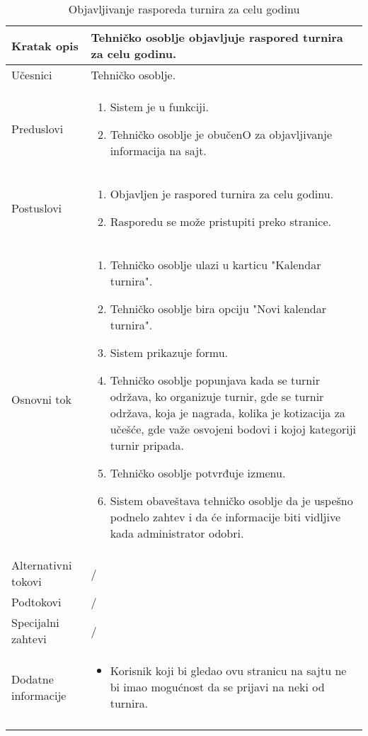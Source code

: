 \documentclass{article}
\begin{document}
    \begin{longtable}{| p{} | p{} |} 
        \hline
            Kratak opis & Tehničko osoblje objavljuje raspored turnira za celu godinu.\\ 
        \hline    
            Učesnici & Tehničko osoblje.\\
        \hline
            Preduslovi & 
                \begin{enumerate}
                    \item Sistem je u funkciji.
                    \item Tehničko osoblje je obučenO za objavljivanje informacija na sajt.
                \end{enumerate}\\
        \hline  
            Postuslovi & 
                \begin{enumerate}
                    \item Objavljen je raspored turnira za celu godinu.
                    \item Rasporedu se može pristupiti preko stranice.
                \end{enumerate}\\
        \hline
            Osnovni tok & 
                \begin{enumerate}
                    \item Tehničko osoblje ulazi u karticu "Kalendar turnira".
                    \item Tehničko osoblje bira opciju "Novi kalendar turnira".
                    \item Sistem prikazuje formu.
                    \item Tehničko osoblje popunjava kada se turnir održava, ko organizuje turnir, gde se turnir održava, koja je nagrada, kolika je kotizacija za učešće, gde važe osvojeni bodovi i kojoj kategoriji turnir pripada. 
                    \item Tehničko osoblje potvrđuje izmenu.
                    \item Sistem obaveštava tehničko osoblje da je uspešno podnelo zahtev i da će informacije biti vidljive kada administrator odobri.
                \end{enumerate}\\
        \hline
            Alternativni tokovi & /\\
        \hline
            Podtokovi & /\\
        \hline
            Specijalni zahtevi & /\\
        \hline
            Dodatne informacije & 
                \begin{itemize}
                    \item Korisnik koji bi gledao ovu stranicu na sajtu ne bi imao mogućnost da se prijavi na neki od turnira.
                \end{itemize}\\
        \hline 
        \caption{Objavljivanje rasporeda turnira za celu godinu}
    \end{longtable}
\end{document}
